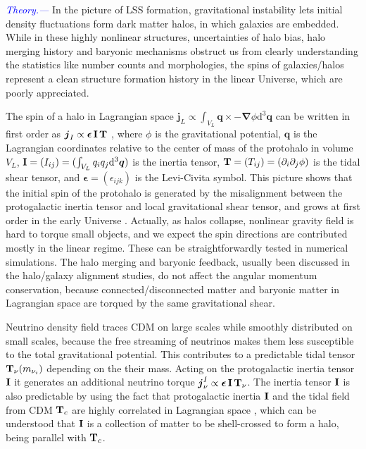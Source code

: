 \documentclass[aps,prd,twocolumn,amsmath,amssymb,amsfont,superscriptaddress]{revtex4-1}
\newcommand{\bs}{\boldsymbol}
\newcommand{\diff}{{\mathrm d}}
\newcommand{\tcb}{\textcolor{blue}}
\begin{document}
\tcb{\textit{Theory.---}}
In the picture of LSS formation, gravitational instability lets initial density fluctuations form dark matter halos, in which galaxies are embedded. While in these highly nonlinear structures, uncertainties of halo bias, halo merging history and baryonic mechanisms obstruct us from clearly understanding the statistics like number counts and morphologies, the spins of galaxies/halos represent a clean structure formation history in the linear Universe, which are poorly appreciated. 

The spin of a halo in Lagrangian space $\bs{j}_L\propto\int_{V_L}\bs{q}\times-\bs{\nabla}\phi\diff^3\bs{q}$ can be written in first order as $\bs{j}_I\propto\bs{\epsilon}\,\bold{I}\,\bold{T}$ \citep{1984ApJ...286...38W}, where $\phi$ is the gravitational potential, $\bs{q}$ is the Lagrangian coordinates relative to the center of mass of the protohalo in volume $V_L$, $\bold{I}=(I_{ij})=(\int_{V_L} q_i q_j \diff^3\bs{q})$ is the inertia tensor, $\bold{T}=(T_{ij})=(\partial_i\partial_j\phi)$ is the tidal shear tensor, and $\bs{\epsilon}=(\epsilon_{ijk})$ is the Levi-Civita symbol. This picture shows that the initial spin of the protohalo is generated by the misalignment between the protogalactic inertia tensor and local gravitational shear tensor, and grows at first order in the early Universe \citep{1984ApJ...286...38W}. Actually, as halos collapse, nonlinear gravity field is hard to torque small objects, and we expect the spin directions are contributed mostly in the linear regime. These can be straightforwardly tested in numerical simulations. The halo merging and baryonic feedback, usually been discussed in the halo/galaxy alignment studies, do not affect the angular momentum conservation, because connected/disconnected matter and baryonic matter in Lagrangian space are torqued by the same gravitational shear.

Neutrino density field traces CDM on large scales while smoothly distributed on small scales, because the free streaming of neutrinos makes them less susceptible to the total gravitational potential. This contributes to a predictable tidal tensor $\bold{T}_\nu(m_{\nu_i})$ depending on the their mass. Acting on the protogalactic inertia tensor $\bold{I}$ it generates an additional neutrino torque $\bs{j}^I_\nu\propto\bs{\epsilon}\,\bold{I}\,\bold{T}_\nu$. The inertia tensor $\bold{I}$ is also predictable by using the fact that protogalactic inertia $\bold{I}$ and the tidal field from CDM $\bold{T}_c$ are highly correlated in Lagrangian space \citep{2000ApJ...532L...5L,2001ApJ...555..106L}, which can be understood that $\bold{I}$ is a collection of matter to be shell-crossed to form a halo, being parallel with $\bold{T}_c$.
\end{document}
